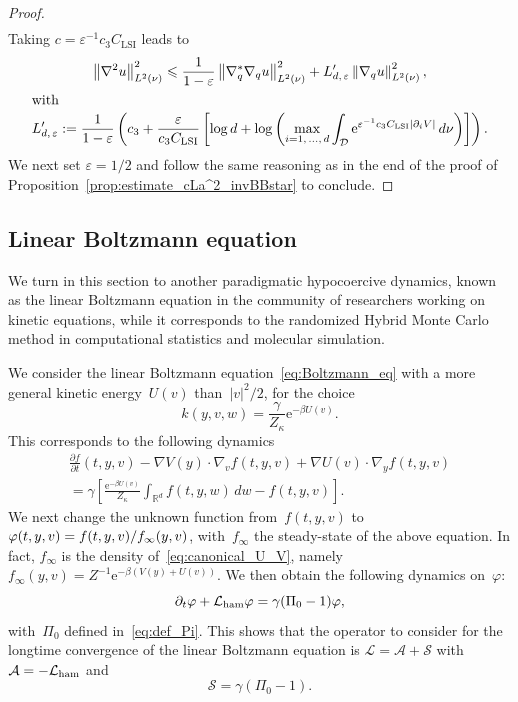 \documentclass[AHL,Unicode,longabstracts,MathTools,published]{cedram}
\newcommand{\rme}{\mathrm{e}}
\newcommand{\LSI}{\mathrm{LSI}}
\newcommand{\cL}{\mathcal{L}}
\newcommand{\cLs}{\mathcal{S}}
\newcommand{\cLa}{\mathcal{A}}
\newcommand{\cD}{\mathcal{D}}
\newcommand{\R}{\mathbb{R}}
\newcommand{\cLham}{\mathcal{L}_{\rm ham}}
\newcommand{\eps}{\varepsilon}
\renewcommand{\leq}{\leqslant}
\begin{document}
\begin{proof}
\begin{multline}
\end{multline}
Taking $c = \varepsilon^{-1}c_3 C_{\LSI}$ leads to
\begin{gather*}
\left\|\nabla^2 u\right\|_{L^2(\nu)}^2 \leq \frac{1}{1-\varepsilon}\left\|\nabla_q^{*}\nabla_q u \right\|_{L^2(\nu)}^2 + L'_{d,\, \varepsilon}\left\|\nabla_q u\right\|_{L^2(\nu)}^2,
\\
\intertext{with}
L'_{d,\,\varepsilon} := \frac{1}{1-\varepsilon}\left(c_3 + \frac{\varepsilon}{c_3 C_{\LSI}}\left[\log d + \log\left(\max_{i=1,\,\dots,\,d} \int_\cD \rme^{\varepsilon^{-1}c_3 C_{\LSI}\left|\partial_i V\right|} \, d\nu \right)\right]\right).
\end{gather*}
We next set $\eps = 1/2$ and follow the same reasoning as in the end of the proof of Proposition~\ref{prop:estimate_cLa^2_invBBstar} to conclude.
\end{proof}

\subsection{Linear Boltzmann equation}\label{sec:PDMP}

We turn in this section to another paradigmatic hypocoercive dynamics, known as the linear Boltzmann equation in the community of researchers working on kinetic equations, while it corresponds to the randomized Hybrid Monte Carlo method in computational statistics and molecular simulation.

We consider the linear Boltzmann equation~\eqref{eq:Boltzmann_eq} with a more general kinetic energy~$U(v)$ than~$|v|^2/2$, for the choice
\[
k(y,v,w) = \frac{\gamma}{Z_\kappa} \rme^{-\beta U(v)}.
\]
This corresponds to the following dynamics
\begin{multline*}
\frac{\partial f}{\partial t}(t,y,v) - \nabla V(y) \cdot \nabla_v f(t,y,v) + \nabla U(v) \cdot\nabla_y f(t,y,v) \\
 = \gamma \left[\frac{\rme^{-\beta U(v)}}{Z_\kappa} \int_{\R^d} f(t,y,w) \, dw - f(t,y,v)\right].
\end{multline*}
We next change the unknown function from~$f(t,y,v)$ to~$\varphi(t,y,v) = f(t,y,v) /\linebreak f_\infty(y,v)$, with~$f_\infty$ the steady-state of the above equation. In fact, $f_\infty$ is the density of~\eqref{eq:canonical_U_V}, namely $f_\infty(y,v) = Z^{-1} \rme^{-\beta (V(y)+U(v))}$. We then obtain the following dynamics on~$\varphi$:
\[
\partial_t \varphi + \cLham \varphi = \gamma(\Pi_0-1)\varphi,
\]
with~$\Pi_0$ defined in~\eqref{eq:def_Pi}. This shows that the operator to consider for the longtime convergence of the linear Boltzmann equation is $\cL = \cLa + \cLs$ with $\cLa = -\cLham$ and
\begin{equation}\label{eq:LFD_PDMP}
\cLs = \gamma(\Pi_0-1).
\end{equation}
\end{document}
